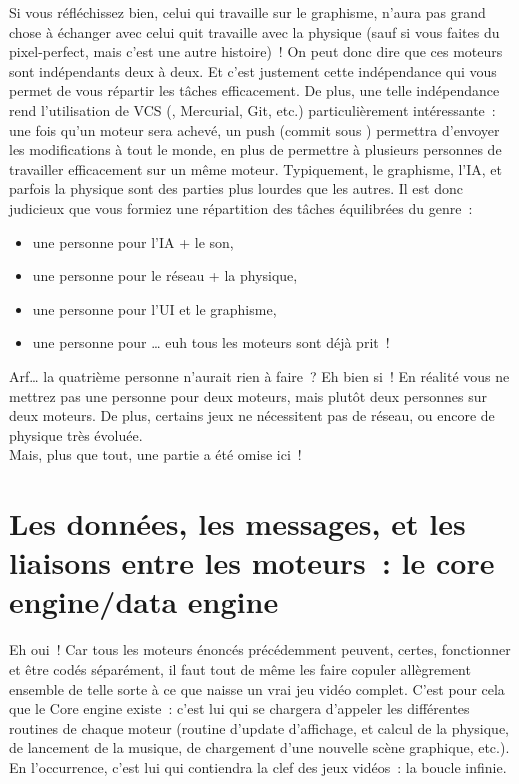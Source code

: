 Si vous réfléchissez bien, celui qui travaille sur le graphisme, n'aura pas grand chose à échanger avec celui quit travaille avec la physique (sauf si vous faites du pixel-perfect, mais c'est une autre histoire)~! On peut donc dire que ces moteurs sont indépendants deux à deux. Et c’est justement cette indépendance qui vous permet de vous répartir les tâches efficacement. De plus, une telle indépendance rend l'utilisation de VCS (\svn, Mercurial, Git, etc.) particulièrement intéressante~: une fois qu'un moteur sera achevé, un push (commit sous \svn) permettra d'envoyer les modifications à tout le monde, en plus de permettre à plusieurs personnes de travailler efficacement sur un même moteur. Typiquement, le graphisme, l'IA, et parfois la physique sont des parties plus lourdes que les autres. Il est donc judicieux que vous formiez une répartition des tâches équilibrées du genre~:

\begin{itemize}
  \item une personne pour l'IA + le son,
  \item une personne pour le réseau + la physique,
  \item une personne pour l'UI et le graphisme,
  \item une personne pour \ldots{} euh tous les moteurs sont déjà prit~!
\end{itemize}

Arf\ldots{} la quatrième personne n'aurait rien à faire~? Eh bien si~! En réalité vous ne mettrez pas une personne pour deux moteurs, mais plutôt deux personnes sur deux moteurs. De plus, certains jeux ne nécessitent pas de réseau, ou encore de physique très évoluée.\\

Mais, plus que tout, une partie a été omise ici~!

\section[Le \emph{core engine}]{Les données, les messages, et les liaisons entre les moteurs~: le \og core engine\fg/\og data engine\fg}

Eh oui~! Car tous les moteurs énoncés précédemment peuvent, certes, fonctionner et être codés séparément, il faut tout de même les faire copuler allègrement ensemble de telle sorte à ce que naisse un vrai jeu vidéo complet. C'est pour cela que le \og Core engine\fg{} existe~: c'est lui qui se chargera d'appeler les différentes routines de chaque moteur (routine d'update d'affichage, et calcul de la physique, de lancement de la musique, de chargement d'une nouvelle scène graphique, etc.). En l'occurrence, c'est lui qui contiendra la clef des jeux vidéos~: la boucle infinie.

